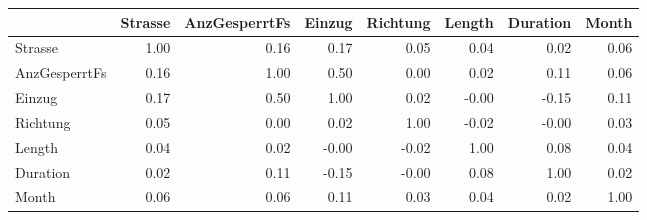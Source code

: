 \begin{tabular}{lrrrrrrr}
\toprule
{} &  Strasse &  AnzGesperrtFs &  Einzug &  Richtung &  Length &  Duration &  Month \\
\midrule
Strasse       &     1.00 &           0.16 &    0.17 &      0.05 &    0.04 &      0.02 &   0.06 \\
AnzGesperrtFs &     0.16 &           1.00 &    0.50 &      0.00 &    0.02 &      0.11 &   0.06 \\
Einzug        &     0.17 &           0.50 &    1.00 &      0.02 &   -0.00 &     -0.15 &   0.11 \\
Richtung      &     0.05 &           0.00 &    0.02 &      1.00 &   -0.02 &     -0.00 &   0.03 \\
Length        &     0.04 &           0.02 &   -0.00 &     -0.02 &    1.00 &      0.08 &   0.04 \\
Duration      &     0.02 &           0.11 &   -0.15 &     -0.00 &    0.08 &      1.00 &   0.02 \\
Month         &     0.06 &           0.06 &    0.11 &      0.03 &    0.04 &      0.02 &   1.00 \\
\bottomrule
\end{tabular}

